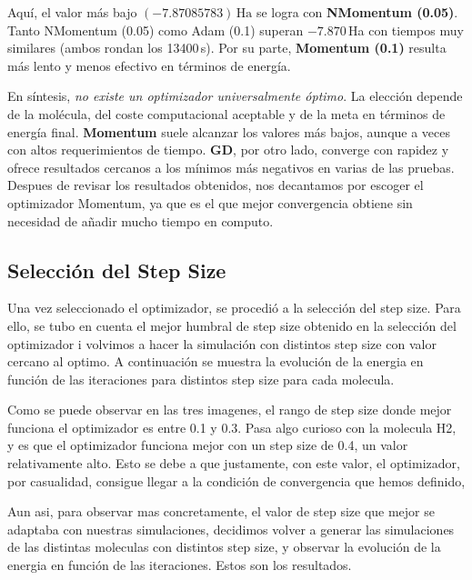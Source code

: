 Aquí, el valor más bajo \((-7.87085783)\,\mathrm{Ha}\) se logra con \textbf{NMomentum (0.05)}. Tanto NMomentum (0.05) como Adam (0.1) superan \(-7.870\)\,Ha con tiempos muy similares (ambos rondan los 13400\,s). Por su parte, \textbf{Momentum (0.1)} resulta más lento y menos efectivo en términos de energía.

En síntesis, \emph{no existe un optimizador universalmente óptimo}. La elección depende de la molécula, del coste computacional aceptable y de la meta en términos de energía final. \textbf{Momentum} suele alcanzar los valores más bajos, aunque a veces con altos requerimientos de tiempo. \textbf{GD}, por otro lado, converge con rapidez y ofrece resultados cercanos a los mínimos más negativos en varias de las pruebas. Despues de revisar los resultados obtenidos, nos decantamos por escoger el optimizador Momentum, ya que es el que mejor convergencia obtiene sin necesidad de añadir mucho tiempo en computo.  


\subsection{Selección del Step Size}
Una vez seleccionado el optimizador, se procedió a la selección del step size. Para ello, se tubo en cuenta el mejor humbral de step size obtenido en la selección del optimizador i volvimos a hacer la simulación con distintos step size con valor cercano al optimo. A continuación se muestra la evolución de la energia en función de las iteraciones para distintos step size para cada molecula.




Como se puede observar en las tres imagenes, el rango de step size donde mejor funciona el optimizador es entre 0.1 y 0.3. Pasa algo curioso con la molecula H2, y es que el optimizador funciona mejor con un step size de 0.4, un valor relativamente alto. Esto se debe a que justamente, con este valor, el optimizador, por casualidad, consigue llegar a la condición de convergencia que hemos definido, %

Aun asi, para observar mas concretamente, el valor de step size que mejor se adaptaba con nuestras simulaciones, decidimos volver a generar las simulaciones de las distintas moleculas con distintos step size, y observar la evolución de la energia en función de las iteraciones. Estos son los resultados.

